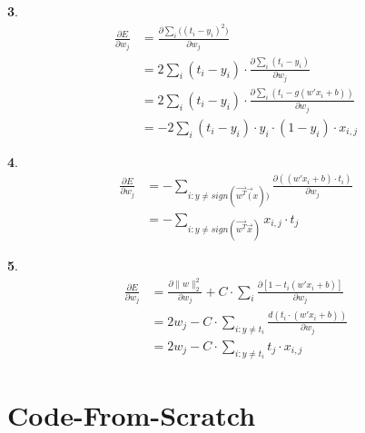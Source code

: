 \documentclass{article}
\begin{document}
\textbf3.\\
\[\begin{aligned}
\frac{\partial E}{\partial w_j}&=\frac{\partial\sum_{i}\big((t_i-y_i)^2)}{\partial w_j}\\
&=2\sum_i(t_i-y_i)\cdot \frac{\partial\sum_i(t_i-y_i)}{\partial w_j}\\
&=2\sum_i(t_i-y_i)\cdot \frac{\partial\sum_i(t_i-g(w'x_i+b))}{\partial w_j}\\
&=-2\sum_i(t_i-y_i)\cdot y_i\cdot (1-y_i) \cdot x_{i, j}
\end{aligned}
\]

\textbf4.\\
\[\begin{aligned}
\frac{\partial E}{\partial w_j} &= -\sum_{i:y\neq sign(\vec{w^T}\vec(x))}
\frac{\partial((w'x_i+b)\cdot t_i)}{\partial w_j}\\
&=-\sum_{i:y\neq sign(\vec{w^T}\vec{x})}x_{i, j}\cdot t_j
\end{aligned}
\]

\textbf5.\\
\[\begin{aligned}
\frac{\partial E}{\partial w_j} &= \frac{\partial\|w\|_2^2}{\partial w_j} + C\cdot \sum_{i}\frac{\partial[1-t_i(w'x_i+b)]}{\partial w_j}\\
&=2w_j-C\cdot \sum_{i: y\neq t_i}\frac{d(t_i\cdot (w'x_i + b))}{\partial w_j}\\
&=2w_j-C\cdot \sum_{i: y\neq t_i}t_j\cdot x_{i, j}
\end{aligned}
\]

\section{Code-From-Scratch}
\end{document}
